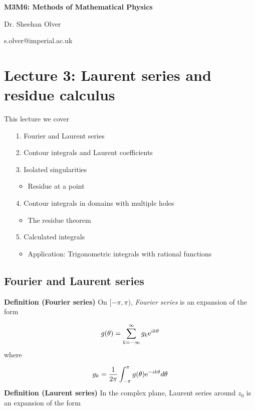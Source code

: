 \documentclass[12pt,a4paper]{article}
\def\E{ {\rm e} }
\begin{document}
\textbf{M3M6: Methods of Mathematical Physics}

Dr. Sheehan Olver

s.olver@imperial.ac.uk

\section{Lecture 3: Laurent series and residue calculus}
This lecture we cover

\begin{itemize}
\item[1. ] Fourier and Laurent series


\item[2. ] Contour integrals and Laurent coefficients


\item[3. ] Isolated singularities

\begin{itemize}
\item Residue at a point

\end{itemize}

\item[4. ] Contour integrals in domains with multiple holes

\begin{itemize}
\item The residue theorem

\end{itemize}

\item[5. ] Calculated integrals

\begin{itemize}
\item Application: Trigonometric integrals with rational functions

\end{itemize}
\end{itemize}
\subsection{Fourier and Laurent series}
\textbf{Definition (Fourier series)} On $[-\pi, \pi)$,  \emph{Fourier series} is an expansion of the form

\[
    g(\theta) = \sum_{k=-\infty}^\infty g_k \E^{i k \theta}
\]
where

\[
g_k = {1\over 2 \pi} \int_{-\pi}^\pi g(\theta) \E^{-i k \theta} d \theta
\]
\textbf{Definition (Laurent series)} In the complex plane, Laurent series around $z_0$ is an expansion of the form 
\end{document}
